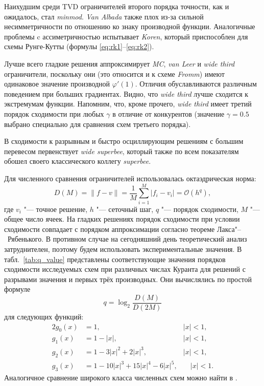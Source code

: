 \documentclass[a4paper,10pt]{article}
\begin{document}
Наихудшим среди TVD ограничителей второго порядка точности, как и ожидалось, стал \textit{minmod}.
\textit{Van Albada} также плох из-за сильной несимметричности по отношению ко знаку производной функции.
Аналогичные проблемы c ассиметричностью испытывает \textit{Koren}, который приспособлен для схемы Рунге-Кутты (формулы \ref{eq:rk1}--\ref{eq:rk2}).

Лучше всего гладкие решения аппроксимирует \textit{MC}, \textit{van Leer} и \textit{wide third} ограничители,
поскольку они (это относится и к схеме \textit{Fromm}) имеют одинаковое значение производной \(\varphi'(1)\).
Отличия обуславливаются различным поведением при больших градиентах.
Видно, что \textit{wide third} лучше сходится к экстремумам функции.
Напомним, что, кроме прочего, \textit{wide third} имеет третий порядок сходимости при любых \(\gamma\) в отличие от конкурентов
(значение \(\gamma=0.5\) выбрано специально для сравнения схем третьего порядка).

В сходимости к разрывным и быстро осциллирующим решениям с большим перевесом первенствует \textit{wide superbee},
который также по всем показателям обошел своего классического коллегу \textit{superbee}.

Для численного сравнения ограничителей использовалась октаэдрическая норма:
\begin{equation}\label{eq:norm}
	D(M) = \|f-v\| = \frac1{M}\sum_{i=1}^{M}|f_i-v_i| = \mathcal{O}(h^q),
\end{equation}
где \(v_i\) "--- точное решение, \(h\) "--- сеточный шаг, \(q\) "--- порядок сходимости, \(M\) "--- общее число ячеек.
На гладких решениях порядок сходимости при условии сходимости совпадает с порядком аппроксимации согласно теореме Лакса"--~Рябенького.
В противном случае на сегодняшний день теоретический анализ затруднителен, поэтому будем использовать экспериментальные значения.
В табл.~\ref{tab:q_value} представлены соответствующие значения порядков сходимости исследуемых схем при различных числах Куранта
для решений с разрывами значения и первых трёх производных. Они вычислялись по простой формуле
\[ q = \log_2\frac{D(M)}{D(2M)} \]
для следующих функций:
\begin{alignat*}{2}
	 g_0(x) &= 1,\quad &|x| < 1, \\
	 g_1(x) &= 1-|x|,\quad &|x| < 1, \\
	 g_2(x) &= 1-3|x|^2+2|x|^3,\quad &|x| < 1, \\
	 g_3(x) &= 1-10|x|^3+15|x|^4-6|x|^5,&\quad |x| < 1. 
\end{alignat*}
Аналогичное сравнение широкого класса численных схем можно найти в \cite{Safronov2010}.
\end{document}
